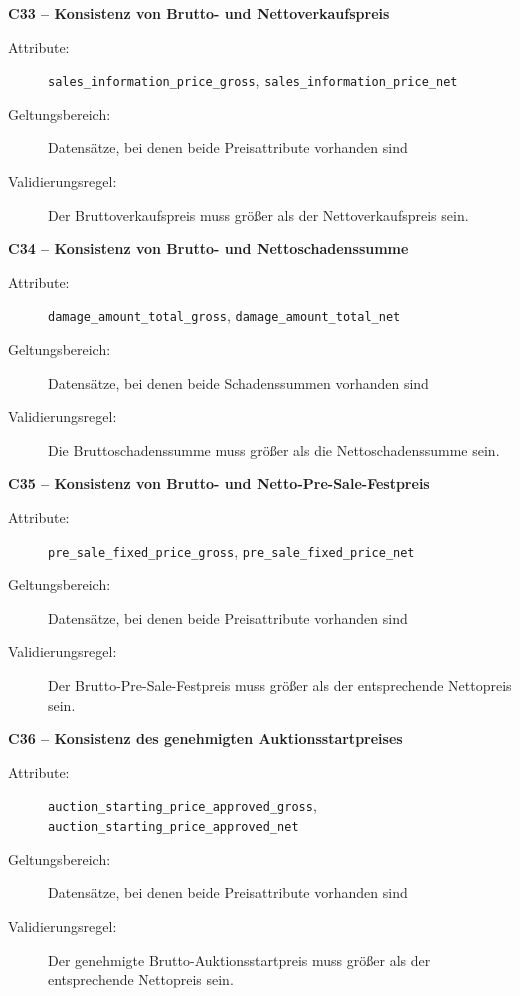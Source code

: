 \documentclass[../main.tex]{subfiles}
\begin{document}
\medskip 
\noindent\textbf{C33 -- Konsistenz von Brutto- und Nettoverkaufspreis} 
\begin{description} 
    \item[Attribute:] \texttt{sales\_information\_price\_gross}, 
    \texttt{sales\_information\_price\_net} 
    \item[Geltungsbereich:] Datensätze, bei denen beide Preisattribute vorhanden sind 
    \item[Validierungsregel:] Der Bruttoverkaufspreis muss größer als der Nettoverkaufspreis sein. 
\end{description} 

\medskip 
\noindent\textbf{C34 -- Konsistenz von Brutto- und Nettoschadenssumme} 
\begin{description} 
    \item[Attribute:] \texttt{damage\_amount\_total\_gross}, \texttt{damage\_amount\_total\_net} 
    \item[Geltungsbereich:] Datensätze, bei denen beide Schadenssummen vorhanden sind 
    \item[Validierungsregel:] Die Bruttoschadenssumme muss größer als die Nettoschadenssumme sein. 
\end{description} 

\medskip 
\noindent\textbf{C35 -- Konsistenz von Brutto- und Netto-Pre-Sale-Festpreis} 
\begin{description}  
    \item[Attribute:] \texttt{pre\_sale\_fixed\_price\_gross}, \texttt{pre\_sale\_fixed\_price\_net} 
    \item[Geltungsbereich:] Datensätze, bei denen beide Preisattribute vorhanden sind 
    \item[Validierungsregel:] Der Brutto-Pre-Sale-Festpreis muss größer als der entsprechende Nettopreis sein. 
\end{description} 

\medskip 
\noindent\textbf{C36 -- Konsistenz des genehmigten Auktionsstartpreises} 
\begin{description} 
    \item[Attribute:] \texttt{auction\_starting\_price\_approved\_gross}, \texttt{auction\_starting\_price\_approved\_net} 
    \item[Geltungsbereich:] Datensätze, bei denen beide Preisattribute vorhanden sind
    \item[Validierungsregel:] Der genehmigte Brutto-Auktionsstartpreis muss größer als der entsprechende Nettopreis sein. 
\end{description} 
\end{document}
